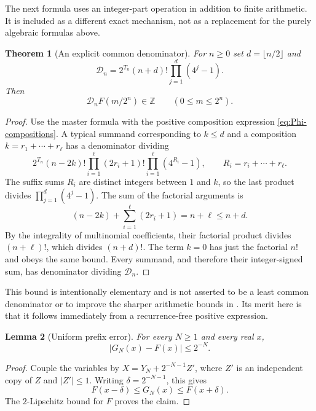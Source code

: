\documentclass[11pt,a4paper]{article}
\numberwithin{equation}{section}
\newtheorem{theorem}{Theorem}[section]
\newtheorem{lemma}[theorem]{Lemma}
\theoremstyle{definition}
\theoremstyle{remark}
\begin{document}
The next formula uses an integer-part operation in addition to finite arithmetic. It is included as a different exact mechanism, not as a replacement for the purely algebraic formulas above.

\begin{theorem}[An explicit common denominator]
\label{thm:denominator}
For $n\ge0$ set $d=\lfloor n/2\rfloor$ and
\begin{equation}
 \mathcal D_n=2^{T_n}(n+d)!\prod_{j=1}^{d}(4^j-1).
 \label{eq:common-denominator}
\end{equation}
Then
\begin{equation}
 \mathcal D_nF(m/2^n)\in\mathbb Z
 \qquad(0\le m\le2^n).
 \label{eq:denominator-integrality}
\end{equation}
\end{theorem}
\begin{proof}
Use the master formula with the positive composition expression \cref{eq:Phi-compositions}. A typical summand corresponding to $k\le d$ and a composition $k=r_1+\cdots+r_\ell$ has a denominator dividing
\[
 2^{T_n}(n-2k)!
  \prod_{i=1}^{\ell}(2r_i+1)!
  \prod_{i=1}^{\ell}(4^{R_i}-1),
 \qquad R_i=r_i+\cdots+r_\ell.
\]
The suffix sums $R_i$ are distinct integers between $1$ and $k$, so the last product divides $\prod_{j=1}^{d}(4^j-1)$. The sum of the factorial arguments is
\[
 (n-2k)+\sum_{i=1}^{\ell}(2r_i+1)=n+\ell\le n+d.
\]
By the integrality of multinomial coefficients, their factorial product divides $(n+\ell)!$, which divides $(n+d)!$. The term $k=0$ has just the factorial $n!$ and obeys the same bound. Every summand, and therefore their integer-signed sum, has denominator dividing $\mathcal D_n$.
\end{proof}
This bound is intentionally elementary and is not asserted to be a least common denominator or to improve the sharper arithmetic bounds in \cite{arias2018}. Its merit here is that it follows immediately from a recurrence-free positive expression.

\begin{lemma}[Uniform prefix error]
\label{lem:prefix-error}
For every $N\ge1$ and every real $x$,
\begin{equation}
 |G_N(x)-F(x)|\le2^{-N}.
 \label{eq:prefix-error}
\end{equation}
\end{lemma}
\begin{proof}
Couple the variables by
$X=Y_N+2^{-N-1}Z'$, where $Z'$ is an independent copy of $Z$ and $|Z'|\le1$. Writing $\delta=2^{-N-1}$, this gives
\[
 F(x-\delta)\le G_N(x)\le F(x+\delta).
\]
The $2$-Lipschitz bound for $F$ proves the claim.
\end{proof}
\end{document}
